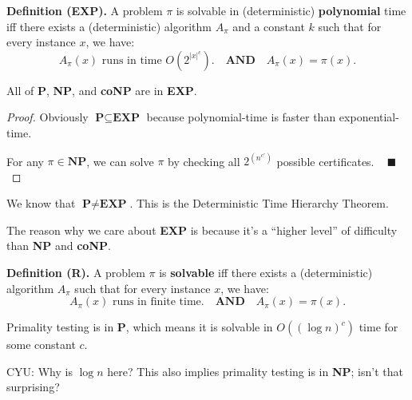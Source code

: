 \textbf{Definition (EXP).} A problem $\pi$ is solvable in (deterministic) \textbf{polynomial} time iff there exists a (deterministic) algorithm $A_{\pi}$ and a constant $k$ such that for every instance $x$, we have:
\[ A_{\pi}(x) \text{ runs in time } O(2^{|x|^c}). ~~~ \textbf{ AND } ~~~ A_{\pi}(x) = \pi(x). \]

\begin{claim}
    All of \textbf{P}, \textbf{NP}, and \textbf{coNP} are in \textbf{EXP}.
\end{claim}

\begin{proof}
    Obviously $\textbf{P} \subseteq \textbf{EXP}$ because polynomial-time is faster than exponential-time.

    For any $\pi \in \textbf{NP}$, we can solve $\pi$ by checking all $2^{\left(n^{c'}\right)}$ possible certificates. ~ $\blacksquare$
\end{proof}

\begin{remark}
    We know that $\textbf{P} \neq \textbf{EXP}$.  This is the Deterministic Time Hierarchy Theorem.

    The reason why we care about \textbf{EXP} is because it's a ``higher level'' of difficulty than \textbf{NP} and \textbf{coNP}.
\end{remark}


\textbf{Definition (R).} A problem $\pi$ is \textbf{solvable} iff there exists a (deterministic) algorithm $A_{\pi}$ such that for every instance $x$, we have:
\[ A_{\pi}(x) \text{ runs in finite time.} ~~~ \textbf{ AND } ~~~ A_{\pi}(x) = \pi(x). \]

\begin{remark}
    Primality testing is in \textbf{P}, which means it is solvable in $O((\log n)^c)$ time for some constant $c$.
    
    CYU: Why is $\log n$ here?  This also implies primality testing is in \textbf{NP}; isn't that surprising?
\end{remark}

